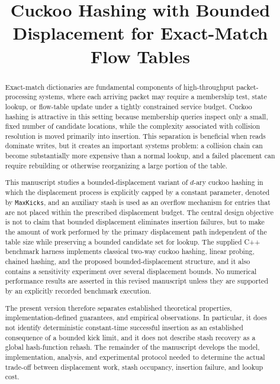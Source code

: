 \documentclass[conference]{IEEEtran}
\begin{document}
\title{Cuckoo Hashing with Bounded Displacement for Exact-Match Flow Tables}

\author{
}

\maketitle

\begin{abstract}
Exact-match dictionaries are fundamental components of high-throughput packet-processing systems, where each arriving packet may require a membership test, state lookup, or flow-table update under a tightly constrained service budget. Cuckoo hashing is attractive in this setting because membership queries inspect only a small, fixed number of candidate locations, while the complexity associated with collision resolution is moved primarily into insertion. This separation is beneficial when reads dominate writes, but it creates an important systems problem: a collision chain can become substantially more expensive than a normal lookup, and a failed placement can require rebuilding or otherwise reorganizing a large portion of the table.

This manuscript studies a bounded-displacement variant of $d$-ary cuckoo hashing in which the displacement process is explicitly capped by a constant parameter, denoted by \texttt{MaxKicks}, and an auxiliary stash is used as an overflow mechanism for entries that are not placed within the prescribed displacement budget. The central design objective is not to claim that bounded displacement eliminates insertion failures, but to make the amount of work performed by the primary displacement path independent of the table size while preserving a bounded candidate set for lookup. The supplied C++ benchmark harness implements classical two-way cuckoo hashing, linear probing, chained hashing, and the proposed bounded-displacement structure, and it also contains a sensitivity experiment over several displacement bounds. No numerical performance results are asserted in this revised manuscript unless they are supported by an explicitly recorded benchmark execution.

The present version therefore separates established theoretical properties, implementation-defined guarantees, and empirical observations. In particular, it does not identify deterministic constant-time successful insertion as an established consequence of a bounded kick limit, and it does not describe stash recovery as a global hash-function rehash. The remainder of the manuscript develops the model, implementation, analysis, and experimental protocol needed to determine the actual trade-off between displacement work, stash occupancy, insertion failure, and lookup cost.
\end{abstract}
\end{document}

